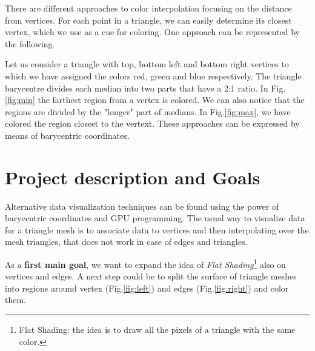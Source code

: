 \documentclass[11pt]{article}
\begin{document}
There are different approaches to color interpolation focusing on the distance from vertices. For each point in a triangle, we can easily determine its closest vertex, which we use as a cue for coloring.
One approach can be represented by the following. 

Let us consider a triangle with top, bottom left and bottom right vertices to which we have assigned the colors red, green and blue respectively.
The triangle 
barycentre divides
each median into two parts that have a 2:1 ratio.
In Fig.\ref{fig:min} the farthest region from a vertex is colored. We can also notice that the regions are divided by the "longer" part of medians.
In Fig.\ref{fig:max}, we have colored the region closest to the vertext. 
These approaches can be expressed by means of barycentric coordinates.

\section{Project description and Goals}
Alternative data visualization techniques can be found using the power of barycentric coordinates and GPU programming.
The usual way to visualize data for a triangle mesh is to associate data 
to vertices and then interpolating over the mesh triangles, that does not work in case of edges and triangles. 


As a \textbf{first main goal}, we want to expand the idea of \textit{Flat Shading}\footnote{Flat Shading: the idea is to draw all the pixels
of a triangle with the same 
color.} also on vertices and edges. A next step could be to split the surface of triangle meshes into regions around vertex (Fig.\ref{fig:left}) and edges (Fig.\ref{fig:right}) and 
color them. 
\end{document}
